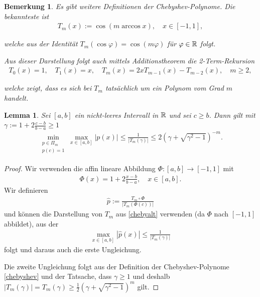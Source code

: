 \documentclass{article}
\theoremstyle{plain}
\newtheorem{lemma}      [theorem]{Lemma}
\newtheorem{remark}     [theorem]{Bemerkung}
\begin{document}
\begin{remark}
	Es gibt weitere Definitionen der Chebyshev-Polynome. Die bekannteste ist
	\begin{align}\label{chebyalt}
		T_m(x) := \cos(m \arccos x), \quad x \in [-1,1],
	\end{align}

	welche aus der Identität $T_m(\cos \varphi) = \cos (m \varphi)$ für $\varphi \in \mathbb{R}$ folgt.

	Aus dieser Darstellung folgt auch mittels Additionstheorem die 2-Term-Rekursion
	\begin{align*}
		T_0(x) = 1, \quad T_1(x) = x, \quad T_{m}(x) = 2x T_{m-1}(x) - T_{m-2}(x), \quad m \geq 2,
	\end{align*}

	welche zeigt, dass es sich bei $T_m$ tatsächlich um ein Polynom vom Grad $m$ handelt.
\end{remark}

\begin{lemma}
	\label{lem:polminmax}
	Sei $[a,b]$ ein nicht-leeres Intervall in $\mathbb{R}$ und sei $c \geq b$. Dann gilt mit $\gamma := 1 + 2 \frac{c-b}{b-a} \geq 1$
	\begin{align}\label{polminmax}
		\min_{\substack{p \in \Pi_m \\
		p(c) = 1}} \max_{x \in [a,b]} |p(x)| \leq \frac{1}{|T_m(\gamma)|} \leq 2 (\gamma + \sqrt{\gamma^2 -1})^{-m}.
	\end{align}
\end{lemma}

\begin{proof}
	Wir verwenden die affin lineare Abbildung $\Phi: [a,b] \to [-1,1]$ mit
	\begin{align*}
		\Phi(x) = 1 + 2 \frac{x-b}{b-a}, \quad x \in [a,b].
	\end{align*}
	Wir definieren
	\begin{align*}
		\hat{p} := \frac{T_m \circ \Phi}{|T_m(\Phi(c))|}
	\end{align*}
	und können die Darstellung von $T_m$ aus \eqref{chebyalt} verwenden (da $\Phi$ nach $[-1,1]$ abbildet), aus der
	\begin{align*}
		\max_{x \in [a,b]}|\hat{p}(x)| \leq \frac{1}{|T_m(\gamma)|}
	\end{align*}
	folgt und daraus auch die erste Ungleichung.

	Die zweite Ungleichung folgt aus der Definition der Chebyshev-Polynome \eqref{chebyshev} und der Tatsache, dass $\gamma \geq 1$ und deshalb $|T_m(\gamma)| = T_m(\gamma) \geq \frac{1}{2} (\gamma+ \sqrt{\gamma^2-1})^m$ gilt.
\end{proof}
\end{document}
